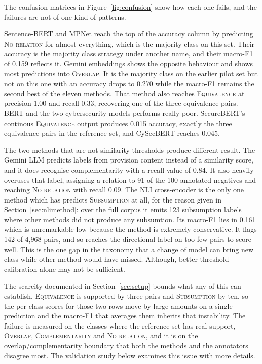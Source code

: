The confusion matrices in Figure~\ref{fig:confusion} show how each one fails, and
the failures are not of one kind of patterns. 

Sentence-BERT and MPNet reach the top of the accuracy column by predicting
\textsc{No relation} for almost everything, which is the majority class on this
set. Their accuracy is the majority class strategy under another name, and their
macro-F1 of 0.159 reflects it. Gemini embeddings shows the opposite behaviour and shows most
predictions into \textsc{Overlap}. It is the majority class on the earlier pilot set but
not on this one with an accuracy drops to 0.270 while the macro-F1 remains the second best of
the eleven methods. That method also reaches \textsc{Equivalence} at precision 1.00 and
recall 0.33, recovering one of the three equivalence pairs. BERT and the two cybersecurity models performs really poor. SecureBERT's continous \textsc{Equivalence}
output produces 0.015 accuracy, exactly the three equivalence pairs in the
reference set, and CySecBERT reaches 0.045.

The two methods that are not similarity thresholds produce different result. The
Gemini LLM predicts labels from provision content instead of a similarity score, and it
does recognise complementarity with a recall value of 0.84. It also heavily overuses that
label, assigning a relation to 91 of the 100 annotated negatives and reaching
\textsc{No relation} with recall 0.09. The NLI cross-encoder is the only one method
which has predicts \textsc{Subsumption} at all, for the reason given in
Section~\ref{sec:nlimethod}: over the full corpus it emits 123 subsumption labels
where other methods did not produce any subsumtion. Its macro-F1 lies in 0.161 which is 
unremarkable low because the method is extremely conservative. It flags 142 of
4{,}968 pairs, and so reaches the directional label on too few pairs to score
well. This is the one gap in the taxonomy that a change of model can bring new class while other method would have missed. Although, better threshold calibration alone may not be sufficient. 

The scarcity documented in Section~\ref{sec:setup} bounds what any of this can
establish. \textsc{Equivalence} is supported by three pairs and
\textsc{Subsumption} by ten, so the per-class scores for those two rows move by
large amounts on a single prediction and the macro-F1 that averages them inherits
that instability. The failure is measured on the classes where the reference set
has real support, \textsc{Overlap}, \textsc{Complementarity} and \textsc{No
relation}, and it is on the overlap/complementarity boundary that both the methods
and the annotators disagree most. The validation study below examines this issue with more details. 

